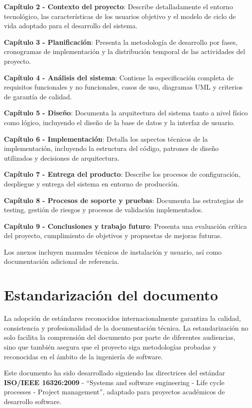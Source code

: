 \documentclass[12pt,a4paper,oneside]{report}
\begin{document}
\textbf{Capítulo 2 - Contexto del proyecto}: Describe detalladamente el
entorno tecnológico, las características de los usuarios objetivo y el
modelo de ciclo de vida adoptado para el desarrollo del sistema.

\textbf{Capítulo 3 - Planificación}: Presenta la metodología de
desarrollo por fases, cronogramas de implementación y la distribución
temporal de las actividades del proyecto.

\textbf{Capítulo 4 - Análisis del sistema}: Contiene la especificación
completa de requisitos funcionales y no funcionales, casos de uso,
diagramas UML y criterios de garantía de calidad.

\textbf{Capítulo 5 - Diseño}: Documenta la arquitectura del sistema
tanto a nivel físico como lógico, incluyendo el diseño de la base de
datos y la interfaz de usuario.

\textbf{Capítulo 6 - Implementación}: Detalla los aspectos técnicos de
la implementación, incluyendo la estructura del código, patrones de
diseño utilizados y decisiones de arquitectura.

\textbf{Capítulo 7 - Entrega del producto}: Describe los procesos de
configuración, despliegue y entrega del sistema en entorno de
producción.

\textbf{Capítulo 8 - Procesos de soporte y pruebas}: Documenta las
estrategias de testing, gestión de riesgos y procesos de validación
implementados.

\textbf{Capítulo 9 - Conclusiones y trabajo futuro}: Presenta una
evaluación crítica del proyecto, cumplimiento de objetivos y propuestas
de mejoras futuras.

Los anexos incluyen manuales técnicos de instalación y usuario, así como
documentación adicional de referencia.

\section{Estandarización del
documento}\label{estandarizaciuxf3n-del-documento}

La adopción de estándares reconocidos internacionalmente garantiza la
calidad, consistencia y profesionalidad de la documentación técnica. La
estandarización no solo facilita la comprensión del documento por parte
de diferentes audiencias, sino que también asegura que el proyecto siga
metodologías probadas y reconocidas en el ámbito de la ingeniería de
software.

Este documento ha sido desarrollado siguiendo las directrices del
estándar \textbf{ISO/IEEE 16326:2009} - ``Systems and software
engineering - Life cycle processes - Project management'', adaptado para
proyectos académicos de desarrollo software.
\end{document}
